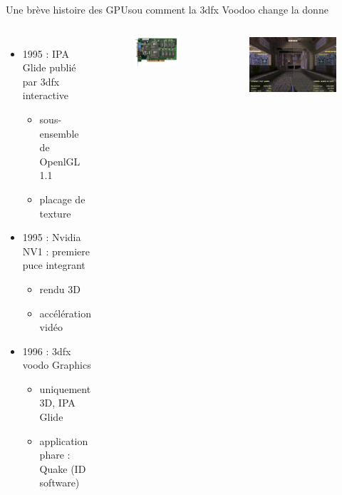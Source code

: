 \documentclass[11pt,mathserif]{beamer}
\begin{document}
\begin{frame}{Une brève histoire des GPUs}{ou comment la 3dfx Voodoo change la donne}
  \begin{columns}[t]
    \column{7cm}
    \begin{itemize}[<+->]
      \item 1995 : IPA Glide publié par 3dfx interactive
        \begin{itemize}
         \item sous-ensemble de OpenlGL 1.1
         \item placage de texture
         \end{itemize}
      \item 1995 : Nvidia NV1 : premiere puce integrant
        \begin{itemize}
          \item rendu 3D
          \item accélération vidéo
         \end{itemize}
      \item 1996 : 3dfx voodo Graphics
        \begin{itemize}
          \item uniquement 3D, IPA Glide
          \item application phare : Quake (ID software)
        \end{itemize} 
    \end{itemize} 
    \column{5cm}
\begin{figure}[htbp]
  \includegraphics[width=0.7\linewidth]{fig/3dfx.jpg}
 \end{figure}
\begin{figure}[htbp]
  \includegraphics[width=0.8\linewidth]{fig/quake_3fx.png}

\end{figure}
\end{columns}
\end{frame}
\end{document}
